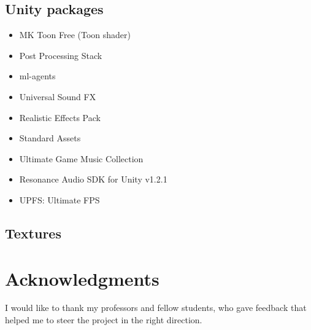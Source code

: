 \documentclass[a4paper, twoside, 10pt]{report}
\begin{document}
\section{Unity packages}
\begin{itemize}
\item MK Toon Free (Toon shader) %
\item Post Processing Stack %
\item ml-agents %
\item Universal Sound FX %
\item Realistic Effects Pack %
\item Standard Assets %
\item Ultimate Game Music Collection %
\item Resonance Audio SDK for Unity v1.2.1 %
\item UPFS: Ultimate FPS %
\end{itemize}

\section{Textures}




\listoffigures
\listoftables

\chapter*{Acknowledgments}
I would like to thank my professors and fellow students, who gave feedback that helped me to steer the project in the right direction.
\end{document}
